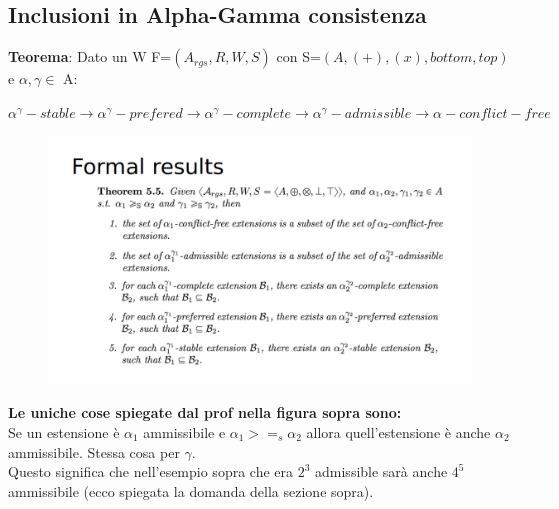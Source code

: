     \subsection{Inclusioni in Alpha-Gamma consistenza}
    \textbf{Teorema}: Dato un W F=$(A_{rgs }, R, W, S)$ con S=$(A, (+), (x),
bottom, top)$ e $\alpha, \gamma \in$ A:
    \begin{center}
        $\alpha^\gamma-stable \rightarrow \alpha^\gamma-prefered \rightarrow
            \alpha^\gamma-complete \rightarrow \alpha^\gamma-admissible \rightarrow
            \alpha-conflict-free$
    \end{center}
    \begin{figure}[htp]
        \centering
        \includegraphics[width=15cm, keepaspectratio]{img/Cap6/alpha-gamma2.png}
    \end{figure}
    \textbf{Le uniche cose spiegate dal prof nella figura sopra sono:}
    \\Se un estensione è $ \alpha_1$ ammissibile e $\alpha_1 >=_s \alpha_2$
    allora quell'estensione è anche $\alpha_2$ ammissibile. Stessa cosa per
$\gamma$. \\Questo significa che nell'esempio sopra che era $2^3$ admissible
    sarà anche $4^5$ ammissibile (ecco spiegata la domanda della sezione sopra).

